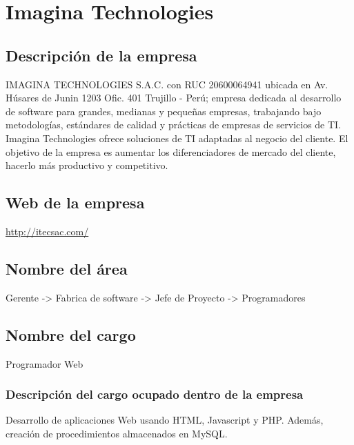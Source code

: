 
\section{Imagina Technologies}

\subsection{Descripción de la empresa}

IMAGINA TECHNOLOGIES S.A.C. con RUC 20600064941 ubicada en Av. Húsares de Junin 1203 Ofic. 401 Trujillo - Perú; empresa dedicada al desarrollo de software para grandes, medianas y pequeñas empresas, trabajando bajo metodologías, estándares de calidad y prácticas de empresas de servicios de TI. Imagina Technologies ofrece soluciones de TI adaptadas al negocio del cliente. El objetivo de la empresa es aumentar los diferenciadores de mercado del cliente, hacerlo más productivo y competitivo. 

\subsection{Web de la empresa}
\url{http://itecsac.com/}

\subsection{Nombre del área}
Gerente -> Fabrica de software -> Jefe de Proyecto -> Programadores


\subsection{Nombre del cargo}
Programador Web

\subsubsection{Descripción del cargo ocupado dentro de la empresa} 
Desarrollo de aplicaciones Web usando HTML, Javascript y PHP. Además, creación de procedimientos almacenados en MySQL.

